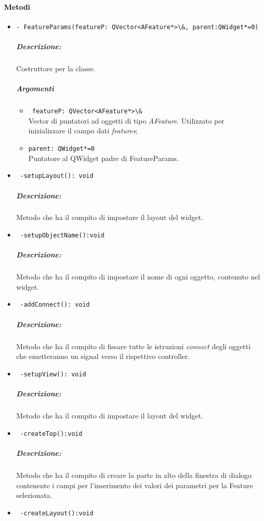 \paragraph{\textcolor{black}{Metodi\\}}
\begin{itemize}
\item\color{blue}\verb!- FeatureParams(featureP: QVector<AFeature*>\&, parent:QWidget*=0)!

\subparagraph{Descrizione: }\color{black}Costruttore per la classe. \\
\subparagraph{Argomenti}
\begin{itemize}
\item\color{RoyalPurple} \verb! featureP: QVector<AFeature*>\& !\\ Vector di puntatori ad oggetti di tipo \emph{AFeature}. Utilizzato per inizializzare il campo dati \emph{features};
\item \color{RoyalPurple} \verb!parent: QWidget*=0 ! \\ Puntatore al QWidget padre di FeatureParams.
\end{itemize}
\item\color{blue}\verb! -setupLayout(): void !
\color{black}
\subparagraph{Descrizione: }
 Metodo che ha il compito di impostare il layout del widget.

\item \color{blue}\verb! -setupObjectName():void!
\color{black} 
\subparagraph{Descrizione:} Metodo che ha il compito di impostare il nome di ogni oggetto, contenuto nel widget.

\item \color{blue}\verb! -addConnect(): void!
\color{black} 
\subparagraph{Descrizione: }Metodo che ha il compito di fissare tutte le istruzioni \emph{connect} degli oggetti che emetteranno un signal\g{} verso il rispettivo controller. 
\item \color{blue}\verb! -setupView(): void !
\color{black} 
\subparagraph{Descrizione:} Metodo che ha il compito di impostare il layout del widget.

\item \color{blue}\verb! -createTop():void!
\color{black} 
\subparagraph{Descrizione:} Metodo che ha il compito di creare la parte in alto della finestra di dialogo contenente i campi per l'inserimento dei valori dei parametri per la Feature\g{} selezionata.

\item \color{blue}\verb! -createLayout():void!


\end{itemize}
